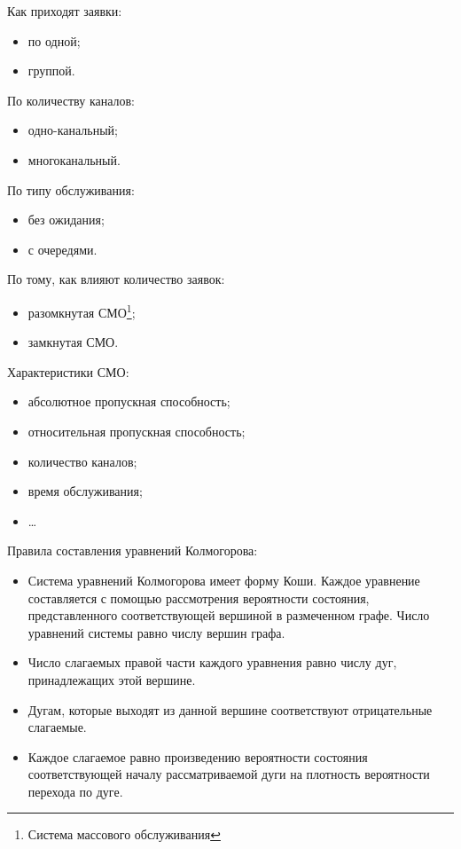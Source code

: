\documentclass[a4paper,12pt,notitlepage,pdftex,headsepline]{scrartcl}
\begin{document}
  Как приходят заявки:
  \begin{itemize}
    \item по одной;
    \item группой.
  \end{itemize}

  По количеству каналов:
  \begin{itemize}
    \item одно-канальный;
    \item многоканальный.
  \end{itemize}

  По типу обслуживания:
  \begin{itemize}
    \item без ожидания;
    \item с очередями.
  \end{itemize}

  По тому, как влияют количество заявок:
  \begin{itemize}
    \item разомкнутая СМО\footnote{Система массового обслуживания};
    \item замкнутая СМО.
  \end{itemize}

  Характеристики СМО:
  \begin{itemize}
    \item абсолютное пропускная способность;
    \item относительная пропускная способность;
    \item количество каналов;
    \item время обслуживания;
    \item \ldots
  \end{itemize}

  Правила составления уравнений Колмогорова:
  \begin{itemize}
    \item Система уравнений Колмогорова имеет форму Коши. Каждое уравнение
      составляется с помощью рассмотрения вероятности состояния, представленного
      соответствующей вершиной в размеченном графе. Число уравнений системы равно
      числу вершин графа.
    \item Число слагаемых правой части каждого уравнения равно числу дуг,
      принадлежащих этой вершине.
    \item Дугам, которые выходят из данной вершине соответствуют отрицательные
      слагаемые.
    \item Каждое слагаемое равно произведению вероятности состояния
      соответствующей началу рассматриваемой дуги на плотность вероятности
      перехода по дуге.
  \end{itemize}
\end{document}
